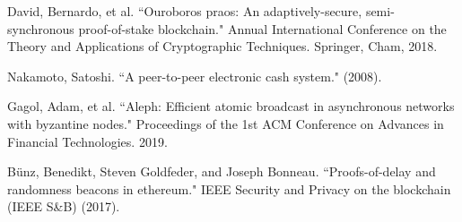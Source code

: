 \documentclass[11pt]{article}
\theoremstyle{definition}
\theoremstyle{remark}
\begin{document}
\begin{thebibliography}{50}
David, Bernardo, et al. ``Ouroboros praos: An adaptively-secure, semi-synchronous proof-of-stake blockchain." Annual International Conference on the Theory and Applications of Cryptographic Techniques. Springer, Cham, 2018.

Nakamoto, Satoshi. ``A peer-to-peer electronic cash system."  (2008).

Gagol, Adam, et al. ``Aleph: Efficient atomic broadcast in asynchronous networks with byzantine nodes." Proceedings of the 1st ACM Conference on Advances in Financial Technologies. 2019.

Bünz, Benedikt, Steven Goldfeder, and Joseph Bonneau. ``Proofs-of-delay and randomness beacons in ethereum." IEEE Security and Privacy on the blockchain (IEEE S\&B) (2017).
\end{thebibliography}
\end{document}
